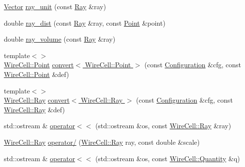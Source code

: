 \begin{DoxyCompactItemize}
\item 
\hyperlink{namespace_wire_cell_aa3c82d3ba85f032b0d278b7004846800}{Vector} \hyperlink{namespace_wire_cell_a15976410f167da6dd279a8facf3218df}{ray\+\_\+unit} (const \hyperlink{namespace_wire_cell_a3ab20d9b438feb7eb1ffaab9ba98af0c}{Ray} \&ray)
\item 
double \hyperlink{namespace_wire_cell_a5ff051f9db5117e68d6a372ce828a90a}{ray\+\_\+dist} (const \hyperlink{namespace_wire_cell_a3ab20d9b438feb7eb1ffaab9ba98af0c}{Ray} \&ray, const \hyperlink{namespace_wire_cell_ab2b2565fa6432efbb4513c14c988cda9}{Point} \&point)
\item 
double \hyperlink{namespace_wire_cell_a3f18b39220ac4ada841bc6cbf10751bf}{ray\+\_\+volume} (const \hyperlink{namespace_wire_cell_a3ab20d9b438feb7eb1ffaab9ba98af0c}{Ray} \&ray)
\item 
{\footnotesize template$<$$>$ }\\\hyperlink{namespace_wire_cell_ab2b2565fa6432efbb4513c14c988cda9}{Wire\+Cell\+::\+Point} \hyperlink{namespace_wire_cell_a936eba17fa684570591e0ed12dc4219a}{convert$<$ Wire\+Cell\+::\+Point $>$} (const \hyperlink{namespace_wire_cell_a9f705541fc1d46c608b3d32c182333ee}{Configuration} \&cfg, const \hyperlink{namespace_wire_cell_ab2b2565fa6432efbb4513c14c988cda9}{Wire\+Cell\+::\+Point} \&def)
\item 
{\footnotesize template$<$$>$ }\\\hyperlink{namespace_wire_cell_a3ab20d9b438feb7eb1ffaab9ba98af0c}{Wire\+Cell\+::\+Ray} \hyperlink{namespace_wire_cell_a377a84d938ffcb68212b7119171e008d}{convert$<$ Wire\+Cell\+::\+Ray $>$} (const \hyperlink{namespace_wire_cell_a9f705541fc1d46c608b3d32c182333ee}{Configuration} \&cfg, const \hyperlink{namespace_wire_cell_a3ab20d9b438feb7eb1ffaab9ba98af0c}{Wire\+Cell\+::\+Ray} \&def)
\item 
std\+::ostream \& \hyperlink{namespace_wire_cell_aa628a54a76d3cfd3fa4701840de17400}{operator$<$$<$} (std\+::ostream \&os, const \hyperlink{namespace_wire_cell_a3ab20d9b438feb7eb1ffaab9ba98af0c}{Wire\+Cell\+::\+Ray} \&ray)
\item 
\hyperlink{namespace_wire_cell_a3ab20d9b438feb7eb1ffaab9ba98af0c}{Wire\+Cell\+::\+Ray} \hyperlink{namespace_wire_cell_a195407cf467c2ccee2d236ad4069dee9}{operator/} (\hyperlink{namespace_wire_cell_a3ab20d9b438feb7eb1ffaab9ba98af0c}{Wire\+Cell\+::\+Ray} ray, const double \&scale)
\item 
std\+::ostream \& \hyperlink{namespace_wire_cell_a7aeb1994aad6589e9d1da7fc24a4b977}{operator$<$$<$} (std\+::ostream \&os, const \hyperlink{class_wire_cell_1_1_quantity}{Wire\+Cell\+::\+Quantity} \&q)

\end{DoxyCompactItemize}
